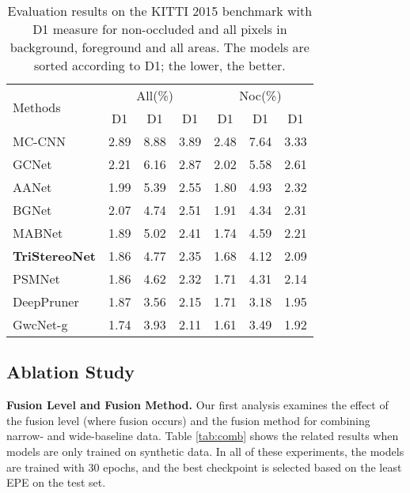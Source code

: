 \documentclass[10pt,twocolumn,letterpaper]{article}
\begin{document}
\begin{table}[tbp]
	\begin{center}
		\footnotesize
		\begin{tabular}{@{\hskip5pt}l@{\hskip5pt}|@{\hskip5pt}c@{\hskip5pt}c@{\hskip5pt}c@{\hskip5pt}|@{\hskip5pt}c@{\hskip5pt}c@{\hskip5pt}c@{\hskip5pt}}
			\hline
			\multirow{2}{*}{Methods} & \multicolumn{3}{c|}{All(\%)} & \multicolumn{3}{c}{Noc(\%)}  \\	 \cline{2-7} 
			& {D1} & {D1} & {D1} & {D1} & {D1} & {D1}  \\ \hline
			MC-CNN\cite{zbontar2016stereo} & 2.89 & 8.88 &3.89 & 2.48 & 7.64& 3.33\\
			GCNet\cite{kendall2017end} & 2.21 & 6.16 & 2.87 & 2.02 & 5.58 & 2.61 \\
			AANet \cite{xu2020aanet} & 1.99 & 5.39 & 2.55 & 1.80 & 4.93 & 2.32 \\
			BGNet\cite{xu2021bilateral} & 2.07 & 4.74 & 2.51 & 1.91 & 4.34 & 2.31 \\ 
			MABNet\cite{xing2020mabnet} & 1.89 & 5.02	 & 2.41 & 1.74 & 4.59	 & 2.21	\\ \hdashline	
			\textbf{TriStereoNet} &  1.86 & 4.77 & 2.35 &  1.68 & 4.12 & 2.09  \\\hdashline
			PSMNet\cite{chang2018pyramid} & 1.86 & 4.62 & 2.32 & 1.71 & 4.31 & 2.14 \\
			DeepPruner \cite{duggal2019deeppruner} & 1.87 & 3.56 & 2.15 & 1.71 & 3.18 & 1.95 \\
			GwcNet-g\cite{guo2019group} & 1.74 & 3.93 & 2.11 & 1.61 & 3.49 & 1.92 \\ \hline
		\end{tabular}
	\end{center}
	\vspace*{-0.6cm}
	\caption{Evaluation results on the KITTI 2015 benchmark with D1 measure for non-occluded and all pixels in background, foreground and all areas. The models are sorted according to D1; the lower, the better.}
	\label{tab:kitti}
\end{table}	 \subsection{Ablation Study}
\noindent\textbf{Fusion Level and Fusion Method.} Our first analysis examines the effect of the fusion level (where fusion occurs) and the fusion method for combining narrow- and wide-baseline data. Table \ref{tab:comb} shows the related results when models are only trained on synthetic data. In all of these experiments, the models are trained with 30 epochs, and the best checkpoint is selected based on the least EPE on the test set.
\end{document}
